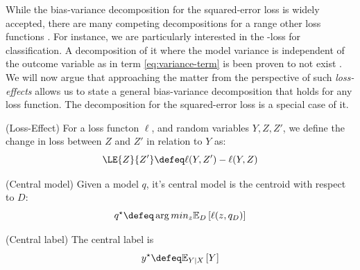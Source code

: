 \documentclass[
	twoside=false, %
]{kaobook}
\begin{document}
While the bias-variance decomposition for the squared-error loss is widely accepted, there are many competing decompositions for a range other loss functions 
\cite{
  kohavi_BiasVarianceDecomposition_,
  hansen_GeneralBiasVariance_2000,
  wood_BiasVarianceDecompositionsMargin_2022,
  didaci_DiversityClassifierEnsembles_2013,
  domingos_UnifiedBiasVarianceDecomposition_,
  pfau_GeneralizedBiasVarianceDecomposition_
  }. For instance, we are particularly interested in the \zeroone-loss for classification. A decomposition of it where the model variance is independent of the outcome variable as in term \ref{eq:variance-term} is been proven to not exist \cite{wood_UnifiedTheoryDiversity_2023}. We will now argue that approaching the matter from the perspective of such \textit{loss-effects} allows us to state a general bias-variance decomposition that holds for any loss function. The decomposition for the squared-error loss is a special case of it.

\begin{definition} (Loss-Effect) For a loss functon $\ell$, and random variables $Y, Z, Z'$, we define the change in loss between $Z$ and $Z'$ in relation to $Y$ as:
  $$
  \LE{Z}{Z'} \defeq \ell(Y, Z') - \ell(Y, Z)
  $$
  \label{def:loss-effect}
\end{definition}

\begin{definition}
\label{def:central-model}
(Central model) Given a model $q$, it's central model is the centroid with respect to $D$:
$$
q^\star \defeq \arg\\min_{z} \mathbb{E}_{D}\left[ \ell(z, q_{D}) \right] 
$$
\end{definition}

\begin{definition}
\label{def:central-label}
(Central label) The central label is 
$$
y^\star \defeq \mathbb{E}_{Y|X}\left[ Y \right] 
$$
\end{definition}
\end{document}
